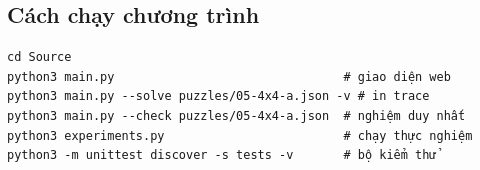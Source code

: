 \documentclass{article}
\begin{document}
\subsection{Cách chạy chương trình}
\begin{Verbatim}
cd Source
python3 main.py                                # giao diện web
python3 main.py --solve puzzles/05-4x4-a.json -v # in trace
python3 main.py --check puzzles/05-4x4-a.json  # nghiệm duy nhất
python3 experiments.py                         # chạy thực nghiệm
python3 -m unittest discover -s tests -v       # bộ kiểm thử
\end{Verbatim}
\end{document}
